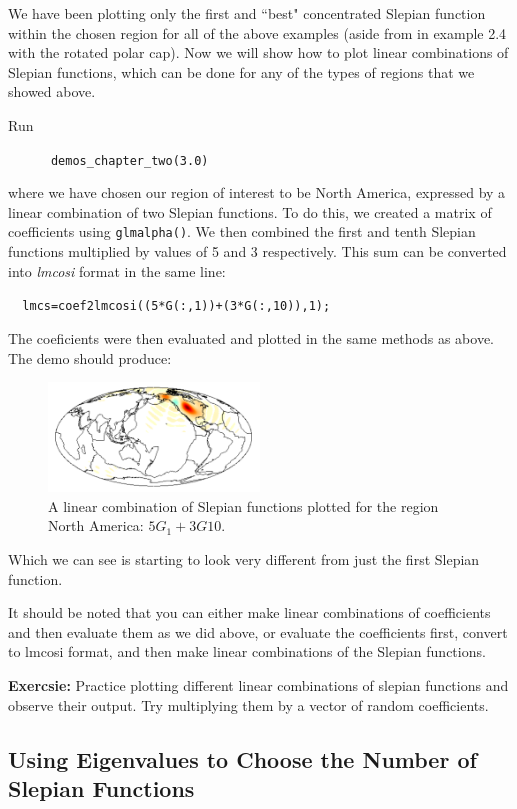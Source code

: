 \documentclass[11pt]{article}
\begin{document}
We have been plotting only the first and ``best" concentrated Slepian function within the chosen region for all of the above examples (aside from in example 2.4 with the rotated polar cap). Now we will show how to plot linear combinations of Slepian functions, which can be done for any of the types of regions that we showed above.

Run

\verb|		demos_chapter_two(3.0)|

where we have chosen our region of interest to be North America, expressed by a linear combination of two Slepian functions. To do this, we created a matrix of coefficients using \verb|glmalpha()|. We then combined the first and tenth Slepian functions multiplied by values of 5 and 3 respectively. This sum can be converted into \textit{lmcosi} format in the same line:

\verb|	lmcs=coef2lmcosi((5*G(:,1))+(3*G(:,10)),1);|

The coeficients were then evaluated and plotted in the same methods as above. The demo should produce:

\begin{figure}[H]
  \centering
  \includegraphics[width=0.5\textwidth]{figures/figure6A.png}
  \caption{A linear combination of Slepian functions plotted for the region North America: $5G_{1} + 3G{10}$.}
\label{figure6}
\end{figure}

Which we can see is starting to look very different from just the first Slepian function.

It should be noted that you can either make linear combinations of coefficients and then evaluate them as we did above, or evaluate the coefficients first, convert to lmcosi format, and then make linear combinations of the Slepian functions.

\textbf{Exercsie:} Practice plotting different linear combinations of slepian functions and observe their output. Try multiplying them by a vector of random coefficients.

\subsection{Using Eigenvalues to Choose the Number of Slepian Functions} 
\end{document}
